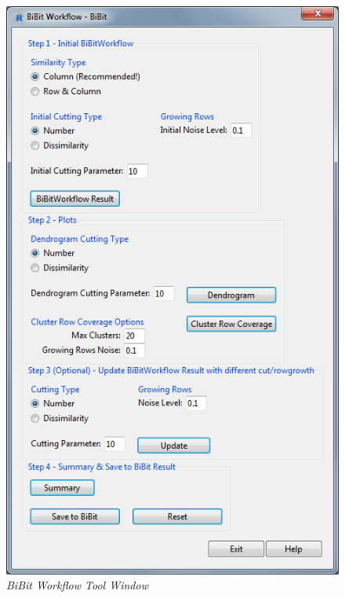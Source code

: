 \documentclass[a4paper]{article}\usepackage[]{graphicx}\usepackage[]{color}
\begin{document}
\begin{figure}[H]
\centering
\includegraphics[scale=0.5]{figures/bibitworkflow.png}
\caption{{\it BiBit Workflow Tool Window}\label{bibit_workflowtool}}
\end{figure}
\end{document}
